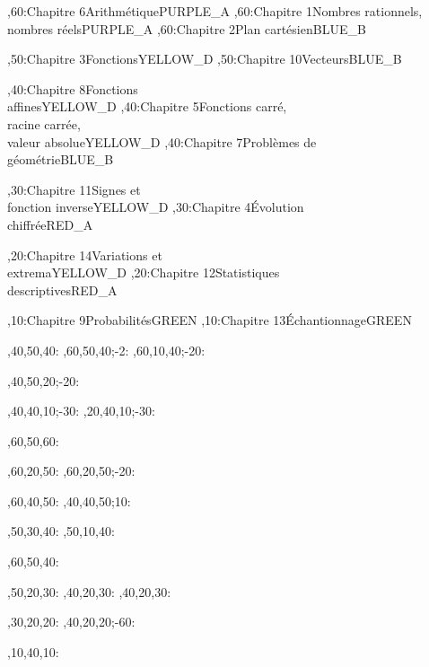 \documentclass[tikz]{standalone}
\begin{document}
%
	\begin{chart}
	,60:{Chapitre 6}{Arithmétique}{}{PURPLE_A}
	,60:{Chapitre 1}{Nombres rationnels, \\ nombres réels}{}{PURPLE_A}
	,60:{Chapitre 2}{Plan cartésien}{}{BLUE_B}
	
	,50:{Chapitre 3}{Fonctions}{}{YELLOW_D}
	,50:{Chapitre 10}{Vecteurs}{}{BLUE_B}
	
	,40:{Chapitre 8}{Fonctions \\ affines}{}{YELLOW_D}
	,40:{Chapitre 5}{Fonctions carré, \\ racine carrée, \\ valeur absolue}{}{YELLOW_D}
	,40:{Chapitre 7}{Problèmes de \\ géométrie}{}{BLUE_B}
	
	,30:{Chapitre 11}{Signes et \\ fonction inverse}{}{YELLOW_D}
	,30:{Chapitre 4}{Évolution \\ chiffrée}{}{RED_A}
	
	,20:{Chapitre 14}{Variations et \\ extrema}{}{YELLOW_D}
	,20:{Chapitre 12}{Statistiques \\ descriptives}{}{RED_A}
	
	,10:{Chapitre 9}{Probabilités}{}{GREEN}
	,10:{Chapitre 13}{Échantionnage}{}{GREEN}
	
	
	
	
	,40,50,40:
	,60,50,40;-2:
	,60,10,40;-20:
	
	
	
	,40,50,20;-20:
	
	,40,40,10;-30:
	,20,40,10;-30:

	,60,50,60:
	
	,60,20,50:
	,60,20,50;-20:
	
	,60,40,50:
	,40,40,50;10:
	
	,50,30,40:
	,50,10,40:
	
	,60,50,40:
	
	,50,20,30:
	,40,20,30:
	,40,20,30:
	
	,30,20,20:
	,40,20,20;-60:
	
	,10,40,10:
	
	\end{chart}
%
\end{document}
